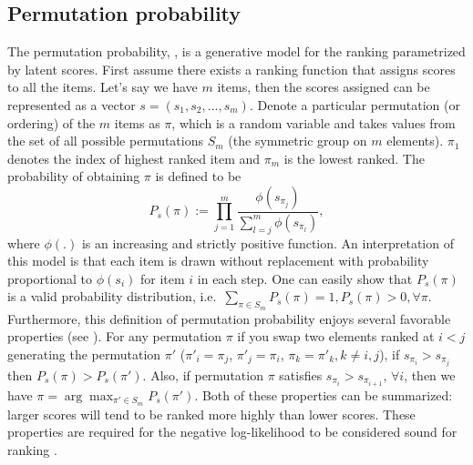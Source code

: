 \documentclass{article}
\begin{document}
\subsection{Permutation probability}
The permutation probability, \cite{cao2007learning}, is a generative model for the ranking parametrized by latent scores. 
First assume there exists a ranking function that assigns scores to all the items. Let's say we have $m$ items, then the scores assigned can be represented as a vector $s = (s_1, s_2, ..., s_m)$. Denote a particular permutation (or ordering) of the $m$ items as $\pi$, which is a random variable and takes values from the set of all possible permutations $S_m$ (the symmetric group on $m$ elements). $\pi_1$ denotes the index of highest ranked item and $\pi_m$ is the lowest ranked.
The probability of obtaining $\pi$ is defined to be
\begin{equation}
\label{eq:permprob}
    P_{s}(\pi) := \prod_{j=1}^m \frac{\phi(s_{\pi_j})}{\sum_{l=j}^{m} \phi(s_{\pi_l})},
\end{equation}
where $\phi(.)$ is an increasing and strictly positive function. 
An interpretation of this model is that each item is drawn without replacement with probability proportional to $\phi(s_i)$ for item $i$ in each step.
One can easily show that $P_{s}(\pi)$ is a valid probability distribution, i.e.~$\sum_{\pi \in S_m} P_{s}(\pi) = 1, P_{s}(\pi) > 0, \forall \pi$. Furthermore, this definition of permutation probability enjoys several favorable properties (see \cite{cao2007learning}). 
For any permutation $\pi$ if you swap two elements ranked at $i<j$ generating the permutation $\pi'$ ($\pi'_i = \pi_j$, $\pi'_j = \pi_i$, $\pi_k = \pi'_k, k\ne i,j$), if $s_{\pi_i} > s_{\pi_j}$ then $P_s(\pi) > P_s(\pi')$.
Also, if permutation $\pi$ satisfies $s_{\pi_i} > s_{\pi_{i+1}}$, $\forall i$, then we have $\pi = \arg\max_{\pi' \in S_m} P_{s}(\pi')$.
Both of these properties can be summarized: larger scores will tend to be ranked more highly than lower scores.
These properties are required for the negative log-likelihood to be considered sound for ranking \cite{xia2008listwise}.
\end{document}
